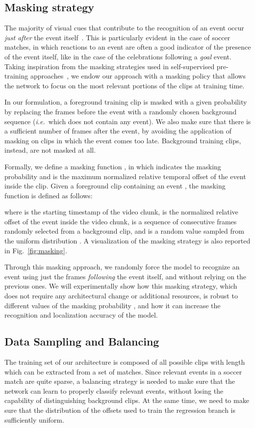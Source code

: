 \documentclass[a4paper,conference]{IEEEtran}
\def \ie {\emph{i.e.}}
\begin{document}
\subsection{Masking strategy}

The majority of visual cues that contribute to the recognition of an event occur \textit{just after} the event itself~\cite{cioppa2020context}. This is particularly evident in the case of soccer matches, in which reactions to an event are often a good indicator of the presence of the event itself, like in the case of the celebrations following a \textit{goal} event. Taking inspiration from the masking strategies used in self-supervised pre-training approaches~\cite{devlin2018bert}, we endow our approach with a masking policy that allows the network to focus on the most relevant portions of the clips at training time.

In our formulation, a foreground training clip is masked with a given probability by replacing the frames before the event with a randomly chosen background sequence (\ie~which does not contain any event). We also make sure that there is a sufficient number of frames after the event, by avoiding the application of masking on clips in which the event comes too late. Background training clips, instead, are not masked at all.

Formally, we define a masking function , in which  indicates the masking probability and  is the maximum normalized relative temporal offset of the event inside the clip. Given a foreground clip  containing an event , the masking function  is defined as follows:

where  is the starting timestamp of the video chunk,  is the normalized relative offset of the event inside the video chunk,  is a sequence of consecutive frames randomly selected from a background clip, and  is a random value sampled from the uniform distribution . A visualization of the masking strategy is also reported in Fig.~\ref{fig:masking}.

Through this masking approach, we randomly force the model to recognize an event using just the frames \textit{following} the event itself, and without relying on the previous ones. We will experimentally show how this masking strategy, which does not require any architectural change or additional resources, is robust to different values of the masking probability , and how it can increase the recognition and localization accuracy of the model. 

\subsection{Data Sampling and Balancing}
\label{sub:augm}
The training set of our architecture is composed of all possible clips with length  which can be extracted from a set of matches. Since relevant events in a soccer match are quite sparse, a balancing strategy is needed to make sure that the network can learn to properly classify relevant events, without losing the capability of distinguishing background clips. At the same time, we need to make sure that the distribution of the offsets used to train the regression branch is sufficiently uniform.
\end{document}
